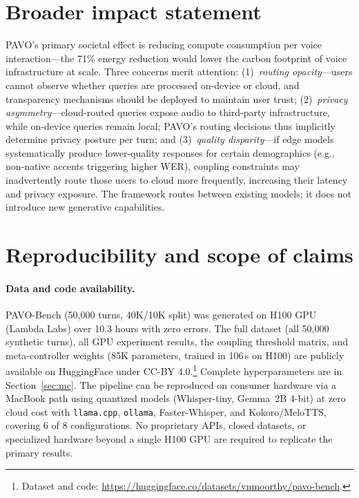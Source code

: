 \documentclass{article}
\begin{document}
\section{Broader impact statement}
\label{sec:broader_impact}

PAVO's primary societal effect is reducing compute consumption per voice interaction---the 71\% energy reduction would lower the carbon footprint of voice infrastructure at scale. Three concerns merit attention: (1)~\emph{routing opacity}---users cannot observe whether queries are processed on-device or cloud, and transparency mechanisms should be deployed to maintain user trust; (2)~\emph{privacy asymmetry}---cloud-routed queries expose audio to third-party infrastructure, while on-device queries remain local; PAVO's routing decisions thus implicitly determine privacy posture per turn; and (3)~\emph{quality disparity}---if edge models systematically produce lower-quality responses for certain demographics (e.g., non-native accents triggering higher WER), coupling constraints may inadvertently route those users to cloud more frequently, increasing their latency and privacy exposure. The framework routes between existing models; it does not introduce new generative capabilities.

\section{Reproducibility and scope of claims}
\label{sec:reproducibility}
\label{sec:scope}

\paragraph{Data and code availability.}
PAVO-Bench (50{,}000 turns, 40K/10K split) was generated on H100 GPU (Lambda Labs) over 10.3 hours with zero errors. The full dataset (all 50{,}000 synthetic turns), all GPU experiment results, the coupling threshold matrix, and meta-controller weights (85K parameters, trained in 106\,s on H100) are publicly available on HuggingFace under CC-BY 4.0.\footnote{Dataset and code: \url{https://huggingface.co/datasets/vnmoorthy/pavo-bench}.} Complete hyperparameters are in Section~\ref{sec:mc}. The pipeline can be reproduced on consumer hardware via a MacBook path using quantized models (Whisper-tiny, Gemma~2B 4-bit) at zero cloud cost with \texttt{llama.cpp}, \texttt{ollama}, Faster-Whisper, and Kokoro/MeloTTS, covering 6 of 8 configurations. No proprietary APIs, closed datasets, or specialized hardware beyond a single H100 GPU are required to replicate the primary results.
\end{document}
